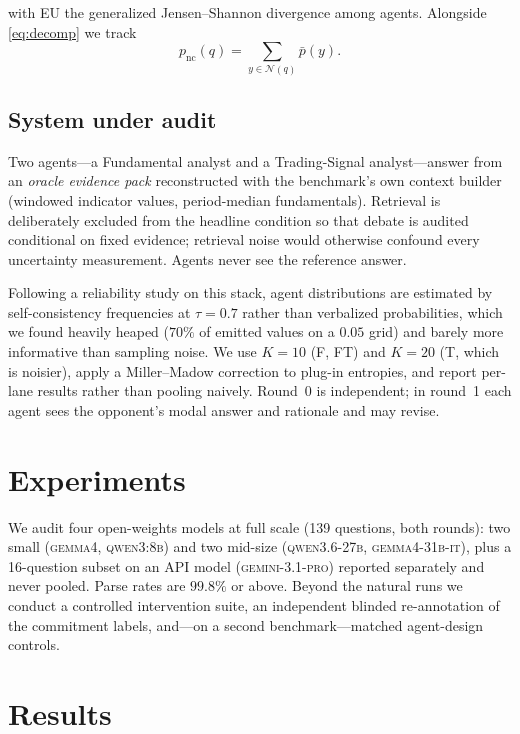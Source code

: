 \documentclass[sigconf,anonymous,review]{acmart}
\begin{document}
with EU the generalized Jensen--Shannon divergence among agents. Alongside
\eqref{eq:decomp} we track
\begin{equation}
p_{\mathrm{nc}}(q) = \sum_{y \in \mathcal{N}(q)} \bar p(y).
\end{equation}

\subsection{System under audit}

Two agents---a Fundamental analyst and a Trading-Signal analyst---answer from
an \emph{oracle evidence pack} reconstructed with the benchmark's own context
builder (windowed indicator values, period-median fundamentals). Retrieval is
deliberately excluded from the headline condition so that debate is audited
conditional on fixed evidence; retrieval noise would otherwise confound every
uncertainty measurement. Agents never see the reference answer.

Following a reliability study on this stack, agent distributions are
estimated by self-consistency frequencies at $\tau{=}0.7$ rather than
verbalized probabilities, which we found heavily heaped ($70\%$ of emitted
values on a $0.05$ grid) and barely more informative than sampling noise. We
use $K{=}10$ (F, FT) and $K{=}20$ (T, which is noisier), apply a
Miller--Madow correction to plug-in entropies, and report per-lane results
rather than pooling naively. Round~0 is independent; in round~1 each agent
sees the opponent's modal answer and rationale and may revise.

\section{Experiments}

We audit four open-weights models at full scale (139 questions, both rounds):
two small (\textsc{gemma4}, \textsc{qwen3:8b}) and two mid-size
(\textsc{qwen3.6-27b}, \textsc{gemma4-31b-it}), plus a 16-question subset on
an API model (\textsc{gemini-3.1-pro}) reported separately and never pooled.
Parse rates are $99.8\%$ or above. Beyond the natural runs we conduct a
controlled intervention suite, an independent blinded re-annotation of the
commitment labels, and---on a second benchmark---matched agent-design
controls.

\section{Results}
\end{document}
